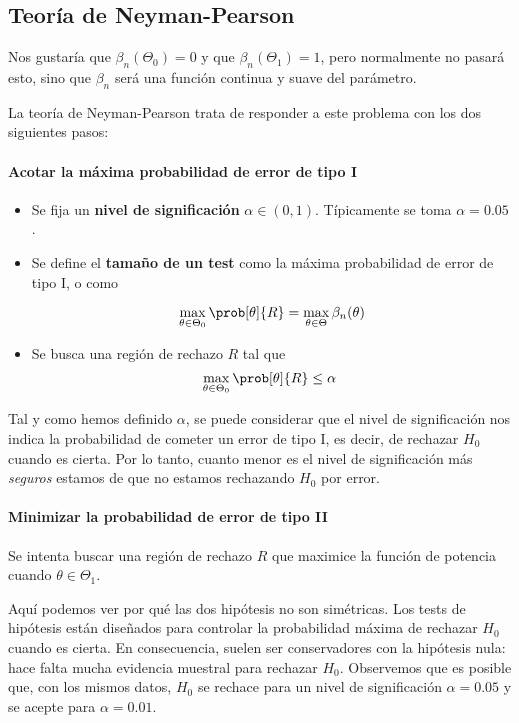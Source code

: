 \documentclass{apuntes}
\begin{document}
\subsection{Teoría de Neyman-Pearson}
\label{secNeymanPearson}
Nos gustaría que $\beta_n(\Theta_0) = 0$ y que $\beta_n(\Theta_1) =1$, pero normalmente no pasará esto, sino que $\beta_n$ será una función continua y suave del parámetro.

La teoría de Neyman-Pearson trata de responder a este problema con los dos siguientes pasos:

\paragraph{Acotar la máxima probabilidad de error de tipo I}

\begin{itemize}
\item Se fija un \textbf{nivel de significación} $\alpha \in (0,1)$. Típicamente se toma $\alpha = 0.05$.
\item Se define el \textbf{tamaño de un test} como la máxima probabilidad de error de tipo I, o como

\[ \max_{\theta \in \Theta_0} \prob[\theta]{R} = \max_{\theta \in \Theta} \beta_n(\theta) \]

\item Se busca una región de rechazo $R$ tal que \[ \max_{\theta \in \Theta_0} \prob[\theta]{R} \leq \alpha \]
\end{itemize}

Tal y como hemos definido $\alpha$, se puede considerar que el nivel de significación nos indica la probabilidad de cometer un error de tipo I, es decir, de rechazar $H_0$ cuando es cierta. Por lo tanto, cuanto menor es el nivel de significación más \textit{seguros} estamos de que no estamos rechazando $H_0$ por error.

\paragraph{Minimizar la probabilidad de error de tipo II}

Se intenta buscar una región de rechazo $R$ que maximice la función de potencia cuando $\theta \in \Theta_1$.

Aquí podemos ver por qué las dos hipótesis no son simétricas. Los tests de hipótesis están diseñados para controlar la probabilidad máxima de rechazar $H_0$ cuando es cierta. En consecuencia, suelen ser conservadores con la hipótesis nula: hace falta mucha evidencia muestral para rechazar $H_0$. Observemos que es posible que, con los mismos datos, $H_0$ se rechace para un nivel de significación $\alpha = 0.05$ y se acepte para $\alpha = 0.01$.
\end{document}
